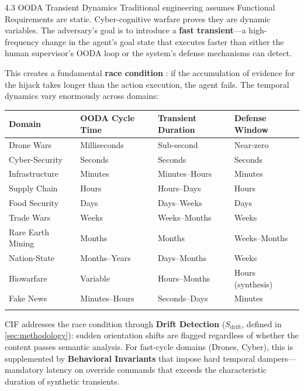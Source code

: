 \documentclass[
  ignorenonframetext,
]{beamer}
\newcounter{none} %
\begin{document}
\begin{frame}[allowframebreaks]{4.3 OODA Transient Dynamics}
\protect{}\label{ooda-transient-dynamics}
Traditional engineering assumes Functional Requirements are static.
Cyber-cognitive warfare proves they are dynamic variables. The
adversary's goal is to introduce a \textbf{fast transient}---a
high-frequency change in the agent's goal state that executes faster
than either the human supervisor's OODA loop or the system's defense
mechanisms can detect.

This creates a fundamental \textbf{race condition}
\cite{osinga2007science}: if the accumulation of evidence for the hijack
takes longer than the action execution, the agent fails. The temporal
dynamics vary enormously across domains:

{\def\LTcaptype{none} %
\begin{longtable}[]{@{}llll@{}}
\toprule\noalign{}
Domain & OODA Cycle Time & Transient Duration & Defense Window \\
\midrule\noalign{}
\endhead
Drone Wars & Milliseconds & Sub-second & Near-zero \\
Cyber-Security & Seconds & Seconds & Seconds \\
Infrastructure & Minutes & Minutes--Hours & Minutes \\
Supply Chain & Hours & Hours--Days & Hours \\
Food Security & Days & Days--Weeks & Days \\
Trade Wars & Weeks & Weeks--Months & Weeks \\
Rare Earth Mining & Months & Months & Weeks--Months \\
Nation-State & Months--Years & Days--Months & Weeks \\
Biowarfare & Variable & Hours--Months & Hours (synthesis) \\
Fake News & Minutes--Hours & Seconds--Days & Minutes \\
\bottomrule\noalign{}
\end{longtable}
}

CIF addresses the race condition through \textbf{Drift Detection}
(\(S_{\text{drift}}\), defined in \cref{sec:methodology}): sudden
orientation shifts are flagged regardless of whether the content passes
semantic analysis. For fast-cycle domains (Drones, Cyber), this is
supplemented by \textbf{Behavioral Invariants} that impose hard temporal
dampers---mandatory latency on override commands that exceeds the
characteristic duration of synthetic transients.


\end{frame}
\end{document}
